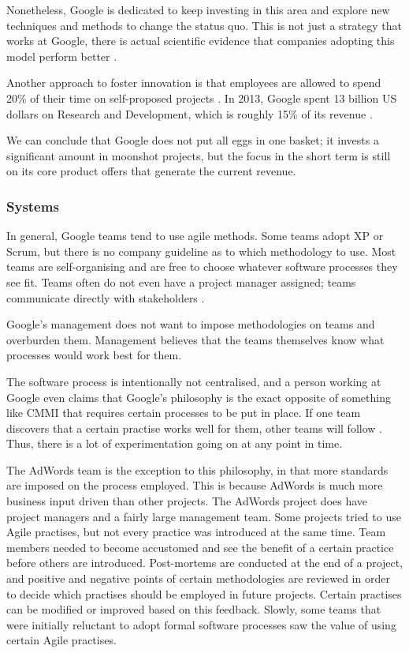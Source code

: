 Nonetheless, Google is dedicated to keep investing in this area and explore new techniques and methods to change the status quo.
This is not just a strategy that works at Google, there is actual scientific evidence that companies adopting this model perform better \citep{nagji2012managing}.

Another approach to foster innovation is that employees are allowed to spend 20\% of their time on self-proposed projects \citep{Rever82:online}.
In 2013, Google spent 13 billion US dollars on Research and Development, which is roughly 15\% of its revenue \citep{Theto49:online}.

We can conclude that Google does not put all eggs in one basket; it invests a significant amount in moonshot projects, but the focus in the short term is still on its core product offers that generate the current revenue.

\subsubsection{Systems}
In general, Google teams tend to use agile methods.
Some teams adopt XP or Scrum, but there is no company guideline as to which methodology to use.
Most teams are self-organising and are free to choose whatever software processes they see fit.
Teams often do not even have a project manager assigned; teams communicate directly with stakeholders \citep{striebeck2006ssh}.

Google's management does not want to impose methodologies on teams and overburden them.
Management believes that the teams themselves know what processes would work best for them.

The software process is intentionally not centralised, and a person working at Google even claims that Google's philosophy is the exact opposite of something like CMMI \citep{W66:online} that requires certain processes to be put in place.
If one team discovers that a certain practise works well for them, other teams will follow \citep{striebeck2006ssh}.
Thus, there is a lot of experimentation going on at any point in time.

The AdWords team is the exception to this philosophy, in that more standards are imposed on the process employed.
This is because AdWords is much more business input driven than other projects.
The AdWords project does have project managers and a fairly large management team.
Some projects tried to use Agile practises, but not every practice was introduced at the same time.
Team members needed to become accustomed and see the benefit of a certain practice before others are introduced.
Post-mortems are conducted at the end of a project, and positive and negative points of certain methodologies are reviewed in order to decide which practises should be employed in future projects.
Certain practises can be modified or improved based on this feedback.
Slowly, some teams that were initially reluctant to adopt formal software processes saw the value of using certain Agile practises.

